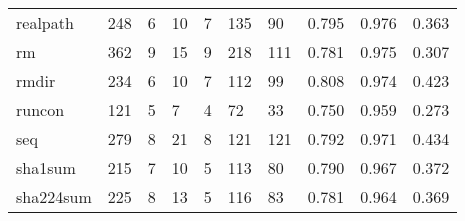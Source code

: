 \begin{longtable}{lp{1.3cm}p{1.3cm}p{1.3cm}p{1.3cm}p{1.3cm}p{1.3cm}p{1.3cm}p{1.3cm}p{1.3cm}}
realpath  &                    248 &                                  6 &                                10 &                                7 &                               135 &                              90 &                                   0.795 &                                  0.976 &                                0.363 \\
rm        &                    362 &                                  9 &                                15 &                                9 &                               218 &                             111 &                                   0.781 &                                  0.975 &                                0.307 \\
rmdir     &                    234 &                                  6 &                                10 &                                7 &                               112 &                              99 &                                   0.808 &                                  0.974 &                                0.423 \\
runcon    &                    121 &                                  5 &                                 7 &                                4 &                                72 &                              33 &                                   0.750 &                                  0.959 &                                0.273 \\
seq       &                    279 &                                  8 &                                21 &                                8 &                               121 &                             121 &                                   0.792 &                                  0.971 &                                0.434 \\
sha1sum   &                    215 &                                  7 &                                10 &                                5 &                               113 &                              80 &                                   0.790 &                                  0.967 &                                0.372 \\
sha224sum &                    225 &                                  8 &                                13 &                                5 &                               116 &                              83 &                                   0.781 &                                  0.964 &                                0.369 \\

\end{longtable}
